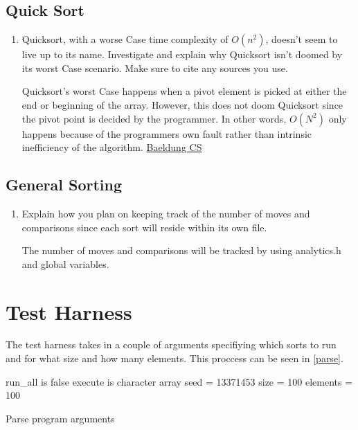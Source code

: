 \documentclass[12pt]{article}
\newenvironment{QandA}{\begin{enumerate}[label=\bfseries\alph*.]\bfseries}
{\end{enumerate}}
\newenvironment{answered}{\par\normalfont}{}
\begin{document}
	\subsection{Quick Sort}
	\begin{QandA}
	\item Quicksort, with a worse Case time complexity of $O(n^2)$, doesn’t seem to live up to its name. Investigate and explain why Quicksort isn’t doomed by its worst Case scenario. Make sure to cite any sources you use.
		\begin{answered}
			Quicksort's worst Case happens when a pivot element is picked at either the end or beginning of the array. However, this does not doom Quicksort since the pivot point is decided by the programmer. In other words, $O(N^2)$ only happens because of the programmers own fault rather than intrinsic inefficiency of the algorithm. \href{https://www.baeldung.com/cs/quicksort-time-complexity-worst-Case}{Baeldung CS}
		\end{answered}


	\end{QandA}

	\subsection{General Sorting}
	\begin{QandA}
	\item Explain how you plan on keeping track of the number of moves and comparisons since each sort will reside within its own file.
		\begin{answered}
			The number of moves and comparisons will be tracked by using analytics.h and global variables.
		\end{answered}


	\end{QandA}


	\section{Test Harness}

	The test harness takes in a couple of arguments specifiying which sorts to run and for what size and how many elements. This proccess can be seen in \vref{parse}.

	\begin{algorithm}
		run\_all is false\;
		execute is character array\;
		seed = 13371453
		size = 100
		elements = 100
		\caption{Parse program arguments}\label{parse}
	\end{algorithm}
\end{document}
